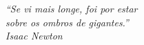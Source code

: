 \begin{epigrafe}
    \vspace*{\fill}
	\begin{flushright}
		\textit{``Se vi mais longe, foi por estar  \\
		sobre os ombros de gigantes.''\\
		Isaac Newton}
	\end{flushright}
\end{epigrafe}
